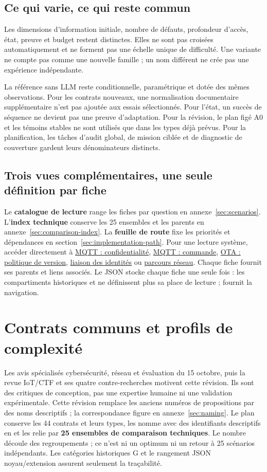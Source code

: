 \documentclass[11pt,a4paper]{article}
\newcommand{\code}[1]{{\small\ttfamily\path{#1}}}
\newcommand{\comparisonlink}[2]{\hyperlink{comparison:#1}{#2}}
\begin{document}
\subsection{Ce qui varie, ce qui reste commun}
Les dimensions d’information initiale, nombre de défauts, profondeur d’accès, état, preuve et budget restent distinctes. Elles ne sont pas croisées automatiquement et ne forment pas une échelle unique de difficulté. Une variante ne compte pas comme une nouvelle famille ; un nom différent ne crée pas une expérience indépendante.

La référence sans LLM reste conditionnelle, paramétrique et dotée des mêmes observations. Pour les contrats nouveaux, une normalisation documentaire supplémentaire n’est pas ajoutée aux essais sélectionnés. Pour l’état, un succès de séquence ne devient pas une preuve d’adaptation. Pour la révision, le plan figé A0 et les témoins stables ne sont utilisés que dans les types déjà prévus. Pour la planification, les tâches d’audit global, de mission ciblée et de diagnostic de couverture gardent leurs dénominateurs distincts.

\subsection{Trois vues complémentaires, une seule définition par fiche}
Le \textbf{catalogue de lecture} range les fiches par question en annexe~\ref{sec:scenarios}. L’\textbf{index technique} conserve les 25 ensembles et les parents en annexe~\ref{sec:comparison-index}. La \textbf{feuille de route} fixe les priorités et dépendances en section~\ref{sec:implementation-path}. Pour une lecture système, accéder directement à \comparisonlink{E02}{MQTT : confidentialité}, \comparisonlink{E16}{MQTT : commande}, \comparisonlink{E06}{OTA : politique de version}, \comparisonlink{E19}{liaison des identités} ou \comparisonlink{E14}{parcours réseau}. Chaque fiche fournit ses parents et liens associés. Le JSON stocke chaque fiche une seule fois : les compartiments historiques \code{cells} et \code{extension_scenarios} ne définissent plus sa place de lecture ; \code{question_organization} fournit la navigation.

\section{Contrats communs et profils de complexité}
\label{sec:grouping}
Les avis spécialisés cybersécurité, réseau et évaluation du 15 octobre, puis la revue IoT/CTF et ses quatre contre-recherches motivent cette révision. Ils sont des critiques de conception, pas une expertise humaine ni une validation expérimentale. Cette révision remplace les anciens numéros de propositions par des noms descriptifs ; la correspondance figure en annexe~\ref{sec:naming}. Le plan conserve les 44 contrats et leurs types, les nomme avec des identifiants descriptifs en \code{s_} et les relie par \textbf{25 ensembles de comparaison techniques}. Le nombre découle des regroupements ; ce n'est ni un optimum ni un retour à 25 scénarios indépendants. Les catégories historiques G et le rangement JSON noyau/extension assurent seulement la traçabilité.
\end{document}
